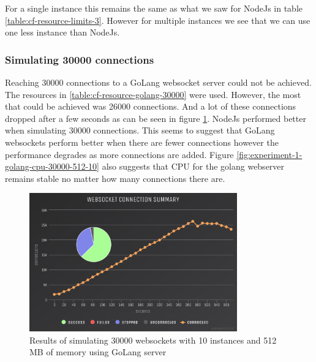 For a single instance this remains the same as what we saw for NodeJs in table \ref{table:cf-resource-limits-3}. However for multiple instances we see that we can use one less instance than NodeJs. 

\subsubsection{Simulating 30000 connections}

Reaching 30000 connections to a GoLang websocket server could not be achieved. The resources in \ref{table:cf-resource-golang-30000} were used. However, the most that could be achieved was 26000 connections. And a lot of these connections dropped after a few seconds as can be seen in figure \ref{fig:experiment-1-golang-conn-30000-512-10}. NodeJs performed better when simulating 30000 connections. This seems to suggest that GoLang websockets perform better when there are fewer connections however the performance degrades as more connections are added. Figure \ref{fig:experiment-1-golang-cpu-30000-512-10} also suggests that CPU for the golang webserver remains stable no matter how many connections there are.

\begin{table}[H]
\caption{Cloud Foundry Resource Limits}
\label{table:cf-resource-golang-30000}
\end{table}

\begin{figure}[H]
  \centering
    \includegraphics[width=0.8\textwidth]{figures/experiments/experiment-1/golang/conn-30000-512-10.png}
    \caption{Results of simulating 30000 websockets with 10 instances and 512 MB of memory using GoLang server}
    \label{fig:experiment-1-golang-conn-30000-512-10}
\end{figure}

